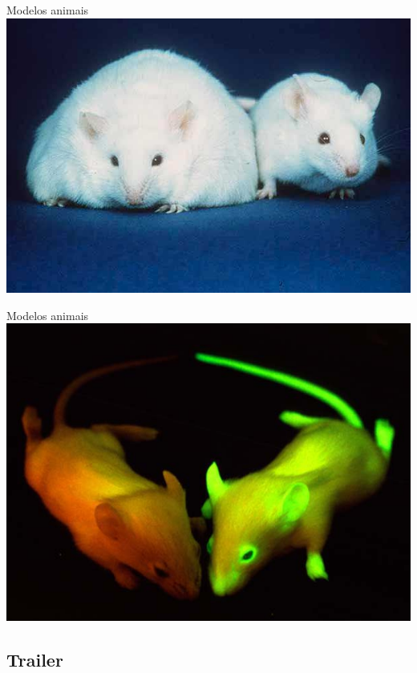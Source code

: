 \documentclass{beamer}
\begin{document}
\begin{frame}{\scriptsize Modelos animais}
  \centering
  \includegraphics[width=\textwidth]{Cap18-19/Fatmouse}
\end{frame}

\begin{frame}{\scriptsize Modelos animais}
  \centering
  \includegraphics[width=\textwidth]{Cap18-19/GFP_hiir}
\end{frame}

\subsection{Trailer}
\end{document}
